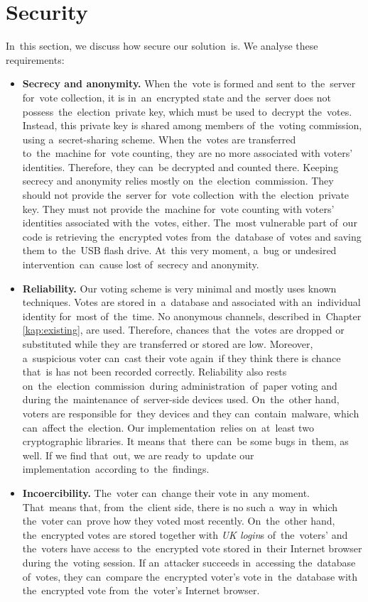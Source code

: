 \section{Security}
In~this section, we discuss how secure our solution~is. We analyse these requirements:
\begin{itemize}
\item \textbf{Secrecy and anonymity.} When the~vote is formed and sent to~the~server for~vote collection, it is in~an~encrypted state and the~server does not possess~the~election~private key, which must be used to~decrypt the~votes. Instead, this private key is shared among members of~the~voting commission, using a~secret-sharing scheme. When the~votes are transferred to~the~machine for~vote counting, they are no more associated with voters' identities. Therefore, they can~be decrypted and counted there. Keeping secrecy and anonymity relies mostly on~the~election~commission. They should not provide the~server for~vote collection~with the~election~private key. They must not provide the~machine for~vote counting with voters' identities associated with the~votes, either. The~most vulnerable part of~our code is retrieving the~encrypted votes from~the~database of~votes and saving them to~the~USB flash drive. At~this very moment, a~bug or undesired intervention~can~cause lost of~secrecy and anonymity.
\item \textbf{Reliability.} Our voting scheme is very minimal and mostly uses known techniques. Votes are stored in~a~database and associated with an~individual identity for~most of~the~time. No anonymous channels, described in~Chapter \ref{kap:existing}, are used. Therefore, chances that~the~votes are dropped or substituted while they are transferred or stored are low. Moreover, a~suspicious voter can~cast their vote again~if they think there is chance that~is has not been recorded correctly. Reliability also rests on~the~election~commission~during administration~of~paper voting and during the~maintenance of~server-side devices used. On~the~other hand, voters are responsible for~they devices and they can~contain~malware, which can~affect the~election. Our implementation~relies on~at~least two cryptographic libraries. It means that~there can~be some bugs in~them, as well. If we find that~out, we are ready to~update our implementation~according to~the~findings. 
\item \textbf{Incoercibility.} The~voter can~change their vote in~any moment. That~means that, from~the~client side, there is no such a~way in~which the~voter can~prove how they voted most recently. On~the~other hand, the~encrypted votes are stored together with \emph{UK login}s of~the~voters' and the~voters have access to~the~encrypted vote stored in~their Internet browser during the~voting session. %
If an~attacker succeeds in~accessing the~database of~votes, they can~compare the~encrypted voter's vote in~the~database with the~encrypted vote from~the~voter's Internet browser.
\end{itemize}

